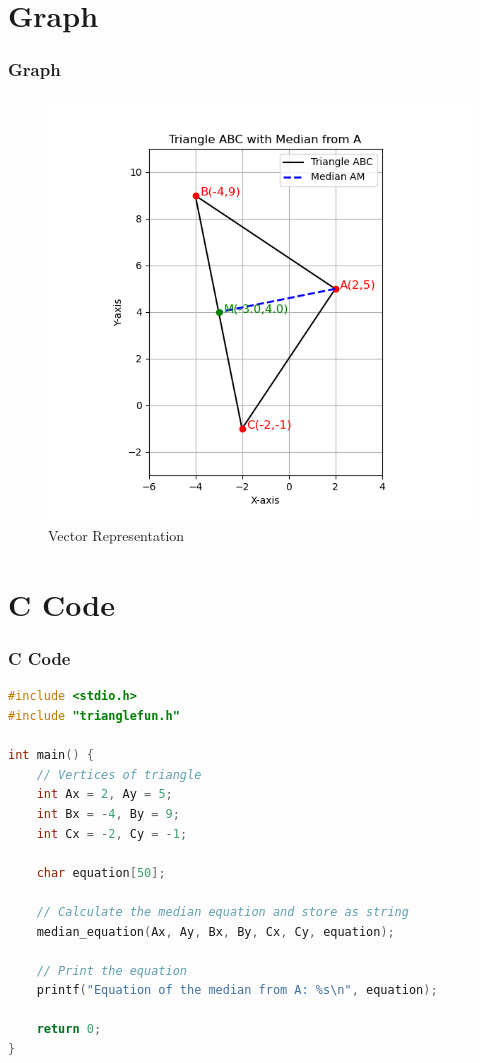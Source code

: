 \documentclass{beamer}
\theoremstyle{remark}
\numberwithin{equation}{section}
\begin{document}
\section{Graph}
\begin{frame}
    \frametitle{Graph}
    \begin{figure}[htbp]
    \centering
    \includegraphics[width=0.65\linewidth]{FIG/fig1.png}
    \caption{Vector Representation}
    \label{fig:FIG/fig1.png}
\end{figure}
\end{frame}
\section{ C Code}
\begin{frame}[fragile]
\frametitle{C Code }
\begin{lstlisting}[language=C]
#include <stdio.h>
#include "trianglefun.h"

int main() {
    // Vertices of triangle
    int Ax = 2, Ay = 5;
    int Bx = -4, By = 9;
    int Cx = -2, Cy = -1;

    char equation[50];

    // Calculate the median equation and store as string
    median_equation(Ax, Ay, Bx, By, Cx, Cy, equation);

    // Print the equation
    printf("Equation of the median from A: %s\n", equation);

    return 0;
}



    
\end{lstlisting}
\end{frame}
\end{document}
